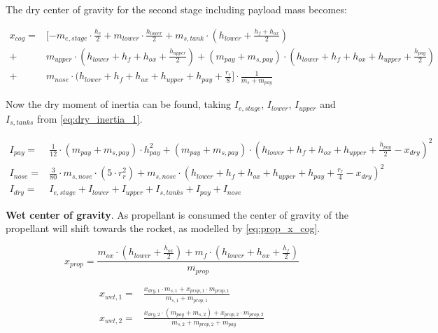 The dry center of gravity for the second stage including payload mass becomes:

\begin{equation}
\begin{aligned}
    x_{cog} =& [-m_{e,stage} \cdot \frac{h_e}{2} + m_{lower} \cdot \frac{h_{lower}}{2} + m_{s,tank} \cdot (h_{lower} + \frac{h_f + h_{ox}}{2}) \\
    +& m_{upper} \cdot (h_{lower} + h_f + h_{ox} + \frac{h_{upper}}{2}) + (m_{pay} + m_{s,pay}) \cdot (h_{lower} + h_f + h_{ox} + h_{upper} +  \frac{h_{pay}}{2}) \\
    +& m_{nose} \cdot (h_{lower} + h_f + h_{ox} + h_{upper} + h_{pay} + \frac{r_r}{8}] \cdot \frac{1}{m_s + m_{pay}}
\end{aligned}
\end{equation}


Now the dry moment of inertia can be found, taking $I_{e,stage}$, $I_{lower}$, $I_{upper}$ and $I_{s,tanks}$ from \autoref{eq:dry_inertia_1}.

\begin{equation}
\begin{aligned}
    I_{pay} =& \frac{1}{12} \cdot (m_{pay} + m_{s,pay}) \cdot  h_{pay}^2 + (m_{pay} + m_{s,pay}) \cdot (h_{lower} + h_f + h_{ox} + h_{upper} + \frac{h_{pay}}{2} - x_{dry})^2 \\
    I_{nose} =& \frac{3}{80} \cdot m_{s,nose} \cdot (5 \cdot r_r^2) + m_{s,nose} \cdot (h_{lower} + h_f + h_{ox} + h_{upper} + h_{pay} + \frac{r_r}{4} - x_{dry})^2 \\
    I_{dry} =& I_{e,stage} + I_{lower} + I_{upper} + I_{s,tanks} + I_{pay} + I_{nose}
\end{aligned}
\label{eq:dry_inertia_2}
\end{equation}

\textbf{Wet center of gravity}. As propellant is consumed the center of gravity of the propellant will shift towards the rocket, as modelled by \autoref{eq:prop_x_cog}.

\begin{equation}
    x_{prop} = \frac{m_{ox} \cdot (h_{lower} + \frac{h_{ox}}{2}) + m_f \cdot (h_{lower} + h_{ox} + \frac{h_f}{2})}{m_{prop}}
\label{eq:prop_x_cog}
\end{equation}

\begin{equation}
\begin{aligned}
    x_{wet,1} =& \frac{x_{dry,1} \cdot m_{s,1} + x_{prop,1} \cdot m_{prop,1}}{m_{s,1} + m_{prop,1}} \\
    x_{wet,2} =& \frac{x_{dry,2} \cdot (m_{pay} + m_{s,2}) + x_{prop,2} \cdot m_{prop,2}}{m_{s,2} + m_{prop,2} + m_{pay}}
\label{eq:wet_cog}
\end{aligned}
\end{equation}

